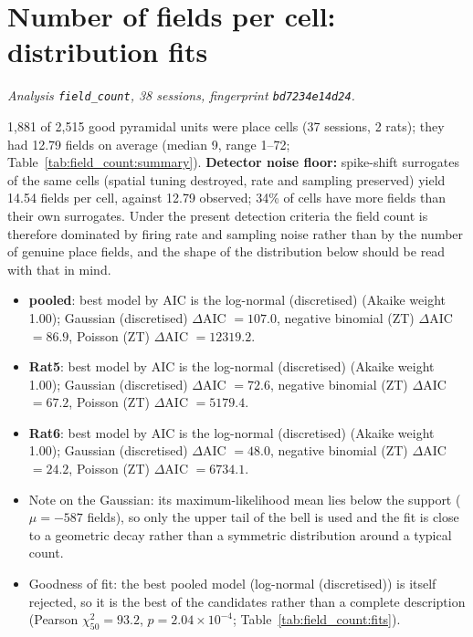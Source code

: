 \section{Number of fields per cell: distribution fits}
\label{sec:field_count}
\noindent\textit{Analysis \texttt{field\_count}, 38 sessions, fingerprint \texttt{bd7234e14d24}.}

1{,}881 of 2{,}515 good pyramidal units were place cells (37 sessions, 2 rats); they had 12.79 fields on average (median 9, range 1--72; Table~\ref{tab:field_count:summary}). \textbf{Detector noise floor:} spike-shift surrogates of the same cells (spatial tuning destroyed, rate and sampling preserved) yield 14.54 fields per cell, against 12.79 observed; 34\% of cells have more fields than their own surrogates. Under the present detection criteria the field count is therefore dominated by firing rate and sampling noise rather than by the number of genuine place fields, and the shape of the distribution below should be read with that in mind.

\begin{itemize}
\item \textbf{pooled}: best model by AIC is the log-normal (discretised) (Akaike weight 1.00); Gaussian (discretised) $\Delta$AIC $= 107.0$, negative binomial (ZT) $\Delta$AIC $= 86.9$, Poisson (ZT) $\Delta$AIC $= 12319.2$.
\item \textbf{Rat5}: best model by AIC is the log-normal (discretised) (Akaike weight 1.00); Gaussian (discretised) $\Delta$AIC $= 72.6$, negative binomial (ZT) $\Delta$AIC $= 67.2$, Poisson (ZT) $\Delta$AIC $= 5179.4$.
\item \textbf{Rat6}: best model by AIC is the log-normal (discretised) (Akaike weight 1.00); Gaussian (discretised) $\Delta$AIC $= 48.0$, negative binomial (ZT) $\Delta$AIC $= 24.2$, Poisson (ZT) $\Delta$AIC $= 6734.1$.
\item Note on the Gaussian: its maximum-likelihood mean lies below the support ($\mu = -587$ fields), so only the upper tail of the bell is used and the fit is close to a geometric decay rather than a symmetric distribution around a typical count.
\item Goodness of fit: the best pooled model (log-normal (discretised)) is itself rejected, so it is the best of the candidates rather than a complete description (Pearson $\chi^2_{50} = 93.2$, $p = 2.04\times10^{-4}$; Table~\ref{tab:field_count:fits}).
\end{itemize}

